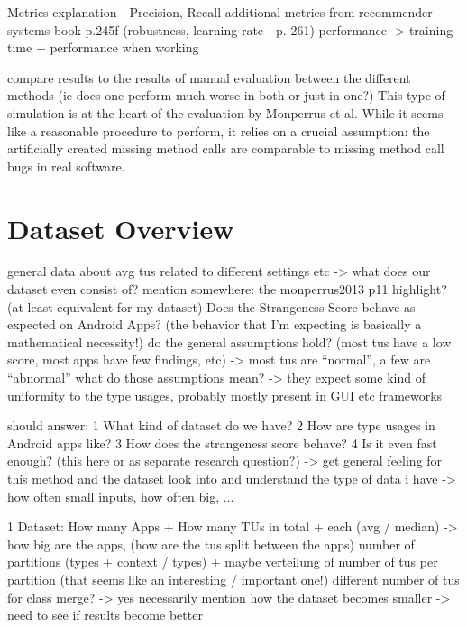 Metrics explanation - Precision, Recall
    additional metrics from recommender systems book p.245f (robustness, learning rate - p. 261)
    performance -> training time + performance when working

compare results to the results of manual evaluation between the different methods (ie does one perform much worse in both or just in one?)
This type of simulation is at the heart of the evaluation by Monperrus et al.
While it seems like a reasonable procedure to perform, it relies on a crucial assumption: the artificially created missing method calls are comparable to missing method call bugs in real software.

\section{Dataset Overview}

general data about avg tus related to different settings etc -> what does our dataset even consist of?
mention somewhere: the monperrus2013 p11 highlight? (at least equivalent for my dataset)
Does the Strangeness Score behave as expected on Android Apps? (the behavior that I'm expecting is basically a mathematical necessity!)
    do the general assumptions hold? (most tus have a low score, most apps have few findings, etc)
        -> most tus are ``normal'', a few are ``abnormal''
        what do those assumptions mean? -> they expect some kind of uniformity to the type usages, probably mostly present in GUI etc frameworks

should answer:
    1 What kind of dataset do we have?
    2 How are type usages in Android apps like?
    3 How does the strangeness score behave?
    4 Is it even fast enough? (this here or as separate research question?)
-> get general feeling for this method and the dataset
look into and understand the type of data i have -> how often small inputs, how often big, ...

1 Dataset:
    How many Apps + How many TUs in total + each (avg / median) -> how big are the apps, (how are the tus split between the apps)
    number of partitions (types + context / types) + maybe verteilung of number of tus per partition (that seems like an interesting / important one!)
    different number of tus for class merge? -> yes necessarily
        mention how the dataset becomes smaller -> need to see if results become better

